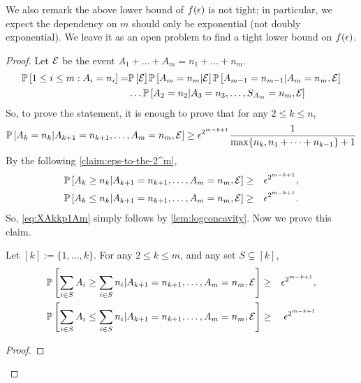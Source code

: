 We also remark the above lower bound of $f({\epsilon})$ is not tight; in particular, we expect the dependency on $m$ should only be exponential (not doubly exponential). We leave it as an open problem to find a tight lower bound on $f({\epsilon})$.
\begin{proof}	
Let ${\cal E}$ be the event $A_1+\dots+A_m=n_1+\dots+n_m$.
\begin{align*}
	{\mathbb{P}}\left[1\leq i\leq m: A_i=n_i\right] =& {\mathbb{P}}\left[{\cal E}\right]{\mathbb{P}}\left[A_m=n_m|{\cal E}\right]{\mathbb{P}}\left[A_{m-1}=n_{m-1} |A_m=n_m,{\cal E}\right]\\
	&\dots {\mathbb{P}}\left[A_2=n_2 | A_3=n_3,\dots,S_{A_m}=n_m,{\cal E}\right]
\end{align*}	
So, to prove the statement, it is enough to prove that for any $2\leq k\leq n$,
\begin{equation}\label{eq:XAkkp1Am} {\mathbb{P}}\left[A_k=n_k | A_{k+1}=n_{k+1},\dots,A_m=n_m,{\cal E}\right]\geq {\epsilon}^{2^{m-k+1}}\frac1{\max\{n_k, n_1+\dots+n_{k-1}\}+1}
\end{equation}
By the following \cref{claim:eps-to-the-2^m},
\begin{eqnarray*}
	{\mathbb{P}}\left[A_k\geq n_k | A_{k+1}=n_{k+1},\dots,A_m=n_m,{\cal E}\right] &\geq & {\epsilon}^{2^{m-k+1}},\\
	{\mathbb{P}}\left[A_k\leq n_k | A_{k+1}=n_{k+1},\dots,A_m=n_m,{\cal E}\right] &\geq & {\epsilon}^{2^{m-k+1}}.
\end{eqnarray*}
So, \eqref{eq:XAkkp1Am} simply follows by \cref{lem:logconcavity}. Now we prove this claim.
\begin{claim}\label{claim:eps-to-the-2^m} Let $[k]:=\{1,\dots,k\}$.
For any $2\leq k\leq m$, and any set $S\subsetneq [k]$,
\begin{eqnarray*}
	{\mathbb{P}}\left[\sum_{i\in S} A_i\geq \sum_{i\in S} n_i | A_{k+1}=n_{k+1},\dots,A_m=n_m,{\cal E}\right]&\geq& {\epsilon}^{2^{m-k+1}},\\
	{\mathbb{P}}\left[\sum_{i\in S} A_i\leq \sum_{i\in S} n_i | A_{k+1}=n_{k+1},\dots,A_m=n_m,{\cal E}\right]&\geq& {\epsilon}^{2^{m-k+1}}	
\end{eqnarray*}	
\end{claim}
\begin{proof}
%

\end{proof}
\end{proof}
